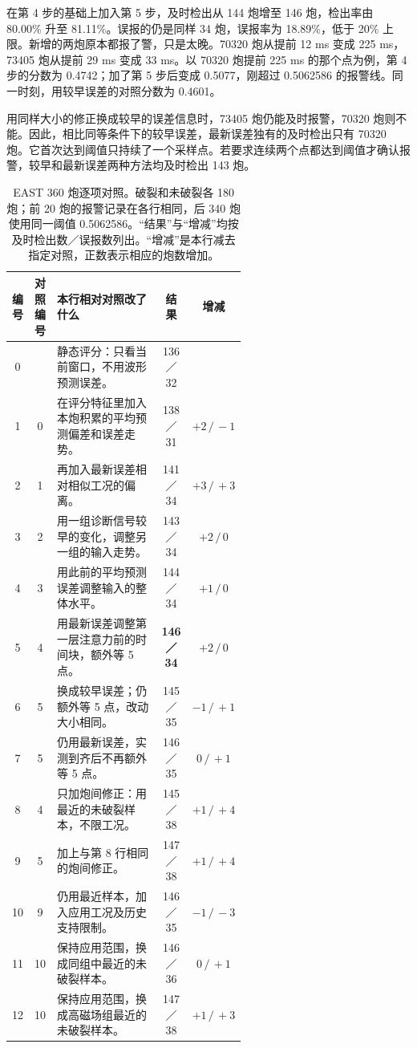 在第 4 步的基础上加入第 5 步，及时检出从 144 炮增至 146 炮，检出率由 80.00\% 升至 81.11\%。误报的仍是同样 34 炮，误报率为 18.89\%，低于 20\% 上限。新增的两炮原本都报了警，只是太晚。70320 炮从提前 12 ms 变成 225 ms，73405 炮从提前 29 ms 变成 33 ms。以 70320 炮提前 225 ms 的那个点为例，第 4 步的分数为 0.4742；加了第 5 步后变成 0.5077，刚超过 0.5062586 的报警线。同一时刻，用较早误差的对照分数为 0.4601。

用同样大小的修正换成较早的误差信息时，73405 炮仍能及时报警，70320 炮则不能。因此，相比同等条件下的较早误差，最新误差独有的及时检出只有 70320 炮。它首次达到阈值只持续了一个采样点。若要求连续两个点都达到阈值才确认报警，较早和最新误差两种方法均及时检出 143 炮。

\begin{table}[!htbp]
\centering
\caption{EAST 360 炮逐项对照。破裂和未破裂各 180 炮；前 20 炮的报警记录在各行相同，后 340 炮使用同一阈值 0.5062586。“结果”与“增减”均按及时检出数／误报数列出。“增减”是本行减去指定对照，正数表示相应的炮数增加。}
\label{tab:east360-ablations}
\footnotesize
\setlength{\tabcolsep}{4.8pt}
\begin{tabular}{@{}ccp{0.58\linewidth}cc@{}}
\toprule
编号 & 对照编号 & 本行相对对照改了什么 & 结果 & 增减 \\
\midrule
0 & & 静态评分：只看当前窗口，不用波形预测误差。 & 136／32 & \\
1 & 0 & 在评分特征里加入本炮积累的平均预测偏差和误差走势。 & 138／31 & \(+2\,/\,-1\) \\
2 & 1 & 再加入最新误差相对相似工况的偏离。 & 141／34 & \(+3\,/\,+3\) \\
3 & 2 & 用一组诊断信号较早的变化，调整另一组的输入走势。 & 143／34 & \(+2\,/\,0\) \\
4 & 3 & 用此前的平均预测误差调整输入的整体水平。 & 144／34 & \(+1\,/\,0\) \\
5 & 4 & 用最新误差调整第一层注意力前的时间块，额外等 5 点。 & \textbf{146／34} & \(+2\,/\,0\) \\
\midrule
6 & 5 & 换成较早误差；仍额外等 5 点，改动大小相同。 & 145／35 & \(-1\,/\,+1\) \\
7 & 5 & 仍用最新误差，实测到齐后不再额外等 5 点。 & 146／35 & \(0\,/\,+1\) \\
\midrule
8 & 4 & 只加炮间修正：用最近的未破裂样本，不限工况。 & 145／38 & \(+1\,/\,+4\) \\
9 & 5 & 加上与第 8 行相同的炮间修正。 & 147／38 & \(+1\,/\,+4\) \\
10 & 9 & 仍用最近样本，加入应用工况及历史支持限制。 & 146／35 & \(-1\,/\,-3\) \\
11 & 10 & 保持应用范围，换成同组中最近的未破裂样本。 & 146／36 & \(0\,/\,+1\) \\
12 & 10 & 保持应用范围，换成高磁场组最近的未破裂样本。 & 147／38 & \(+1\,/\,+3\) \\
\bottomrule
\end{tabular}
\end{table}

